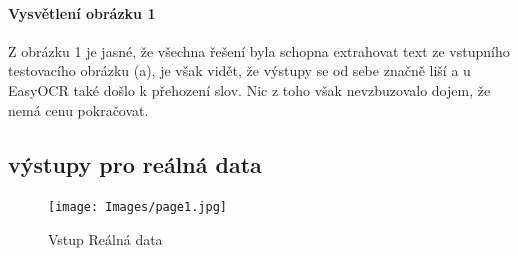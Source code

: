 \documentclass[journal]{IEEEtran}
\begin{document}
\paragraph{Vysvětlení obrázku 1}
Z obrázku 1 je jasné, že všechna řešení byla schopna extrahovat text ze vstupního testovacího obrázku (a), je však vidět, že výstupy se od sebe značně liší a u EasyOCR také došlo k přehození slov. Nic z toho však nevzbuzovalo dojem, že nemá cenu pokračovat.


\subsection{výstupy pro reálná data}

\begin{figure}{\linewidth}
        \centering
        \texttt{[image: Images/page1.jpg]}
        \caption{Vstup Reálná data}
        \label{fig:Test}
\end{figure}
\end{document}
